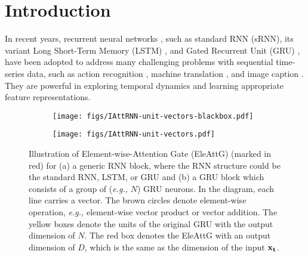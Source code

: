 \documentclass[runningheads]{llncs}
\newcommand{\Outer}{Element-wise}
\begin{document}
\section{Introduction}

In recent years, recurrent neural networks \cite{lipton2015critical}, such as standard RNN (sRNN), its variant Long Short-Term Memory (LSTM) \cite{hochreiter1997long}, and Gated Recurrent Unit (GRU) \cite{cho2014learning}, have been adopted to address many challenging problems with sequential time-series data, such as action recognition \cite{du2015hierarchical}, machine translation \cite{cho14}, and image caption \cite{vinyals2015show}. They are powerful in exploring temporal dynamics and learning appropriate feature representations.


\begin{figure}[!t]
	\centering
	\begin{subfigure}[t]{0.43\linewidth}
		\centering\texttt{[image: figs/IAttRNN-unit-vectors-blackbox.pdf]}
		\caption{}
		\label{subfig:generalRNN}
	\end{subfigure}	
	\begin{subfigure}[t]{0.52\linewidth}
		\centering\texttt{[image: figs/IAttRNN-unit-vectors.pdf]}
		\caption{}			
		\label{subfig:EleGGRU}
	\end{subfigure}
\caption[]{Illustration of \Outer-Attention Gate (EleAttG) (marked in red) for (a) a generic RNN block, where the RNN structure could be the standard RNN, LSTM, or GRU and (b) a GRU block which consists of a group of ({\it e.g.,} $N$) GRU neurons. In the diagram, each line carries a vector. The brown circles denote element-wise operation, {\it e.g.,} element-wise vector product or vector addition. The yellow boxes denote the units of the original GRU with the output dimension of $N$. The red box denotes the EleAttG with an output dimension of $D$, which is the same as the dimension of the input $\bf{x}_t$.}\label{fig:IAttRNN}
\end{figure}
\end{document}
